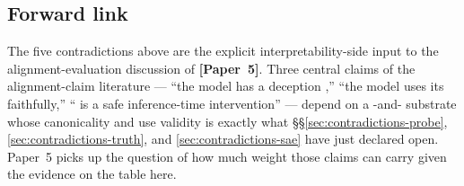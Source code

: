 \subsection{Forward link}
\label{sec:contradictions-forward}

The five contradictions above are the explicit interpretability-side
input to the alignment-evaluation discussion of \textbf{[Paper~5]}.
Three central claims of the alignment-claim literature ---
``the model has a deception ,'' ``the model uses its 
faithfully,'' `` is a safe inference-time
intervention'' --- depend on a -and- substrate whose
canonicality and use validity is exactly what \S\S\ref{sec:contradictions-probe},
\ref{sec:contradictions-truth}, and \ref{sec:contradictions-sae} have
just declared open. Paper~5 picks up the question of how much weight
those claims can carry given the evidence on the table here.
